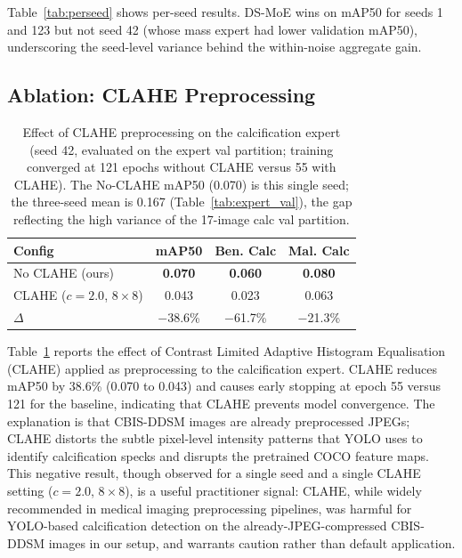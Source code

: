 \documentclass[runningheads]{llncs}
\begin{document}
Table~\ref{tab:perseed} shows per-seed results. DS-MoE wins on mAP50
for seeds 1 and 123 but not seed 42 (whose mass expert had lower
validation mAP50), underscoring the seed-level variance behind the
within-noise aggregate gain.

\subsection{Ablation: CLAHE Preprocessing}
\label{sec:ablation}

\begin{table}[tb]
\caption{Effect of CLAHE preprocessing on the calcification expert
(seed 42, evaluated on the expert val partition; training converged at
121 epochs without CLAHE versus 55 with CLAHE). The No-CLAHE mAP50
(0.070) is this single seed; the three-seed mean is 0.167
(Table~\ref{tab:expert_val}), the gap reflecting the high variance of
the 17-image calc val partition.}
\label{tab:clahe}
\centering
\begin{tabular}{lccc}
\toprule
\textbf{Config} & \textbf{mAP50} & \textbf{Ben. Calc} & \textbf{Mal. Calc}\\
\midrule
No CLAHE (ours) & \textbf{0.070} & \textbf{0.060} & \textbf{0.080}\\
CLAHE ($c{=}2.0$, $8{\times}8$) & 0.043 & 0.023 & 0.063\\
$\Delta$ & $-$38.6\% & $-$61.7\% & $-$21.3\%\\
\bottomrule
\end{tabular}
\end{table}

Table~\ref{tab:clahe} reports the effect of Contrast Limited Adaptive
Histogram Equalisation (CLAHE) applied as preprocessing to the
calcification expert. CLAHE reduces mAP50 by 38.6\% (0.070 to 0.043)
and causes early stopping at epoch 55 versus 121 for the baseline,
indicating that CLAHE prevents model convergence. The explanation is
that CBIS-DDSM images are already preprocessed JPEGs; CLAHE distorts
the subtle pixel-level intensity patterns that YOLO uses to identify
calcification specks and disrupts the pretrained COCO feature maps.
This negative result, though observed for a single seed and a single
CLAHE setting ($c{=}2.0$, $8{\times}8$), is a useful practitioner
signal: CLAHE, while widely recommended in medical imaging preprocessing
pipelines, was harmful for YOLO-based calcification detection on the
already-JPEG-compressed CBIS-DDSM images in our setup, and warrants
caution rather than default application.
\end{document}

